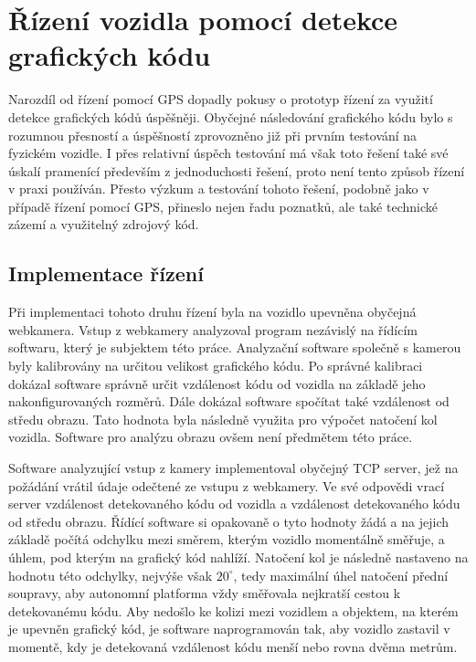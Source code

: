 \documentclass[czech, bachelor]{diploma}
\begin{document}
\section{Řízení vozidla pomocí detekce grafických kódu}

Narozdíl od řízení pomocí GPS dopadly pokusy o prototyp řízení za využití detekce grafických kódů úspěšněji. Obyčejné následování
grafického kódu bylo s rozumnou přesností a úspěšností zprovozněno již při prvním testování na fyzickém vozidle. I přes relativní
úspěch testování má však toto řešení také své úskalí pramenící především z jednoduchosti řešení, proto není tento způsob řízení
v praxi používán. Přesto výzkum a testování tohoto řešení, podobně jako v případě řízení pomocí GPS, přineslo nejen řadu poznatků,
ale také technické zázemí a využitelný zdrojový kód.

\subsection{Implementace řízení}

Při implementaci tohoto druhu řízení byla na vozidlo upevněna obyčejná webkamera. Vstup z webkamery analyzoval program nezávislý
na řídícím softwaru, který je subjektem této práce. Analyzační software společně s kamerou byly kalibrovány na určitou velikost
grafického kódu. Po správné kalibraci dokázal software správně určit vzdálenost kódu od vozidla na základě jeho nakonfigurovaných
rozměrů. Dále dokázal software spočítat také vzdálenost od středu obrazu. Tato hodnota byla následně využita pro výpočet natočení
kol vozidla. Software pro analýzu obrazu ovšem není předmětem této práce.

Software analyzující vstup z kamery implementoval obyčejný TCP server, jež na požádání vrátil údaje odečtené ze vstupu
z webkamery. Ve své odpovědi vrací server vzdálenost detekovaného kódu od vozidla a vzdálenost detekovaného kódu od středu obrazu.
Řídící software si opakovaně o tyto hodnoty žádá a na jejich základě počítá odchylku mezi směrem, kterým vozidlo momentálně
směřuje, a úhlem, pod kterým na grafický kód nahlíží. Natočení kol je následně nastaveno na hodnotu této odchylky, nejvýše však
$20^{\circ}$, tedy maximální úhel natočení přední soupravy, aby autonomní platforma vždy směřovala nejkratší cestou k detekovanému
kódu. Aby nedošlo ke kolizi mezi vozidlem a objektem, na kterém je upevněn grafický kód, je software naprogramován tak, aby
vozidlo zastavil v momentě, kdy je detekovaná vzdálenost kódu menší nebo rovna dvěma metrům.
\end{document}
